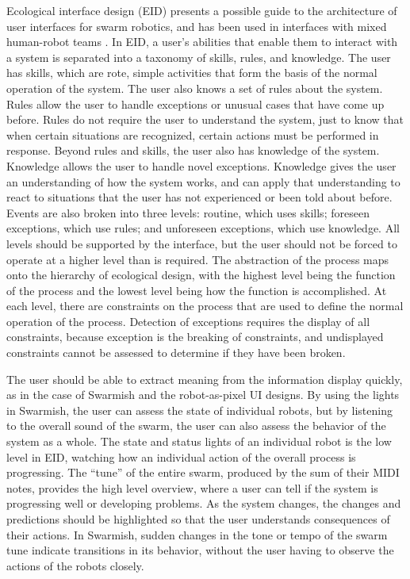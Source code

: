 \documentclass[]{article}
\begin{document}
Ecological interface design (EID) presents a possible guide to the architecture of user interfaces for swarm robotics, and has been used in interfaces with mixed human-robot teams \cite{vicente1992ecological, gancet2010user}. 
In EID, a user's abilities that enable them to interact with a system is separated into a taxonomy of skills, rules, and knowledge. 
The user has skills, which are rote, simple activities that form the basis of the normal operation of the system. 
The user also knows a set of rules about the system. 
Rules allow the user to handle exceptions or unusual cases that have come up before. 
Rules do not require the user to understand the system, just to know that when certain situations are recognized, certain actions must be performed in response. 
Beyond rules and skills, the user also has knowledge of the system. 
Knowledge allows the user to handle novel exceptions. 
Knowledge gives the user an understanding of how the system works, and can apply that understanding to react to situations that the user has not experienced or been told about before. 
Events are also broken into three levels: routine, which uses skills; foreseen exceptions, which use rules; and unforeseen exceptions, which use knowledge. 
All levels should be supported by the interface, but the user should not be forced to operate at a higher level than is required. 
The abstraction of the process maps onto the hierarchy of ecological design, with the highest level being the function of the process and the lowest level being how the function is accomplished. 
At each level, there are constraints on the process that are used to define the normal operation of the process.
Detection of exceptions requires the display of all constraints, because exception is the breaking of constraints, and undisplayed constraints cannot be assessed to determine if they have been broken.

The user should be able to extract meaning from the information display quickly, as in the case of Swarmish and the robot-as-pixel UI designs.
By using the lights in Swarmish, the user can assess the state of individual robots, but by listening to the overall sound of the swarm, the user can also assess the behavior of the system as a whole.
The state and status lights of an individual robot is the low level in EID, watching how an individual action of the overall process is progressing. 
The ``tune'' of the entire swarm, produced by the sum of their MIDI notes, provides the high level overview, where a user can tell if the system is progressing well or developing problems. 
As the system changes, the changes and predictions should be highlighted so that the user understands consequences of their actions. 
In Swarmish, sudden changes in the tone or tempo of the swarm tune indicate transitions in its behavior, without the user having to observe the actions of the robots closely. 
\end{document}
